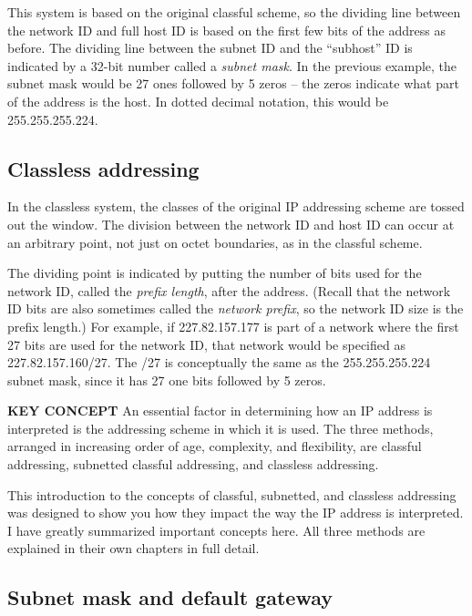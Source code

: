 This system is based on the original classful scheme, so the dividing
line between the network ID and full host ID is based on the first few
bits of the address as before. The dividing line between the subnet ID
and the ``subhost'' ID is indicated by a 32-bit number called a
{\emph{subnet mask}}. In the previous example, the subnet mask would be
27 ones followed by 5 zeros -- the zeros indicate what part of the
address is the host. In dotted decimal notation, this would be
255.255.255.224.




\subsection{Classless addressing}

In the classless system, the classes of the original IP addressing
scheme are tossed out the window. The division between the network ID
and host ID can occur at an arbitrary point, not just on octet
boundaries, as in the classful scheme.

The dividing point is indicated by putting the number of bits used for
the network ID, called the {\emph{prefix length}}, after the address.
(Recall that the network ID bits are also sometimes called the
{\emph{network prefix}}, so the network ID size is the prefix length.)
For example, if 227.82.157.177 is part of a network where the first 27
bits are used for the network ID, that network would be specified as
227.82.157.160/27. The /27 is conceptually the same as the
255.255.255.224 subnet mask, since it has 27 one bits followed by 5
zeros.


{\textbf{KEY CONCEPT}} An essential factor in determining how an IP
address is interpreted is the addressing scheme in which it is used. The
three methods, arranged in increasing order of age, complexity, and
flexibility, are classful addressing, subnetted classful addressing, and
classless addressing.

This introduction to the concepts of classful, subnetted, and classless
addressing was designed to show you how they impact the way the IP
address is interpreted. I have greatly summarized important concepts
here. All three methods are explained in their own chapters in full
detail.




\subsection{Subnet mask and default gateway}

